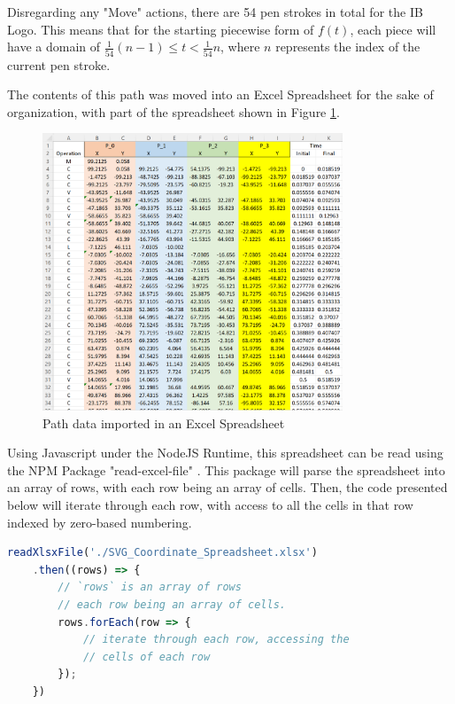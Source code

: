 \documentclass[letterpaper, 12pt]{article}
\begin{document}
Disregarding any "Move" actions, there are 54 pen strokes
in total for the IB Logo. This means that for the starting piecewise
form of \(f(t)\), each piece will have a domain of \(\frac{1}{54}(n-1) \le t < \frac{1}{54}n\),
where \(n\) represents the index of the current pen stroke.

The contents of this path was moved into an Excel Spreadsheet for
the sake of organization, with part of the spreadsheet shown
in Figure \ref*{fig:svgxlsx}.

\begin{figure}[H]
    \centering
    \includegraphics[width=0.8\textwidth]{svgxlsx.png}
    \caption{Path data imported in an Excel Spreadsheet}
    \label{fig:svgxlsx}
\end{figure}

Using Javascript under the NodeJS Runtime, this spreadsheet can
be read using the NPM Package "read-excel-file" \cite{kuchumovReadexcelfile}.
This package will parse the spreadsheet into an array of rows,
with each row being an array of cells. Then, the code presented
below will iterate through each row, with access to all the cells
in that row indexed by zero-based numbering.

\begin{lstlisting}[language=JavaScript]
    readXlsxFile('./SVG_Coordinate_Spreadsheet.xlsx')
    .then((rows) => {
        // `rows` is an array of rows
        // each row being an array of cells.
        rows.forEach(row => {
            // iterate through each row, accessing the
            // cells of each row
        });
    })
\end{lstlisting}
\end{document}
